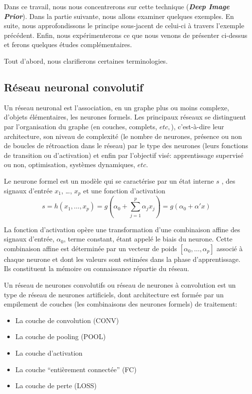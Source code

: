 \documentclass[
  11pt,
  dvipsnames]{article}
\providecommand{\tightlist}{%
  \setlength{\itemsep}{0pt}\setlength{\parskip}{0pt}}
\begin{document}
Dans ce travail, nous nous concentrerons sur cette technique (\textbf{\emph{Deep Image Prior}}). Dans la partie suivante, nous allons examiner quelques exemples. En suite, nous approfondissons le principe sous-jacent de celui-ci à travers l'exemple précédent. Enfin, nous expérimenterons ce que nous venons de présenter ci-dessus et ferons quelques études complémentaires.

Tout d'abord, nous clarifierons certaines terminologies.

\hypertarget{ruxe9seau-neuronal-convolutif}{%
\subsection{Réseau neuronal convolutif}\label{ruxe9seau-neuronal-convolutif}}

Un réseau neuronal est l'association, en un graphe plus ou moins complexe, d'objets élémentaires, les neurones formels. Les principaux réseaux se distinguent par l'organisation du graphe (en couches, complets, \(etc,\)), c'est-à-dire leur architecture, son niveau de complexité (le nombre de neurones, présence ou non de boucles de rétroaction dans le réseau) par le type des neurones (leurs fonctions de transition ou d'activation) et enfin par l'objectif visé: apprentissage supervisé ou non, optimisation, systèmes dynamiques, \(etc.\)

Le neurone formel est un modèle qui se caractérise par
un état interne \(s\) , des signaux d'entrée \(x_{1}\), \dots, \(x_{p}\) et une fonction d'activation
\[ s=h(x_{1},\dots,x_{p})=g(\alpha_{0} + \sum_{j=1}^{p} \alpha_{j}x_{j}) = g(\alpha_{0} + \alpha' x)\]

La fonction d'activation opère une transformation d'une combinaison affine
des signaux d'entrée, \(\alpha_{0}\), terme constant, étant appelé le biais du neurone.
Cette combinaison affine est déterminée par un vecteur de poids
\([\alpha_{0},\dots,\alpha_{p}]\) associé à chaque neurone et dont les valeurs sont estimées dans la phase d'apprentissage. Ils constituent la mémoire ou connaissance répartie du réseau.

Un réseau de neurones convolutifs ou réseau de neurones à convolution
est un type de réseau de neurones artificiels, dont architecture est formée par
un empilement de couches (les combinaisons des neurones formels) de traitement:

\begin{itemize}
\tightlist
\item
  La couche de convolution (CONV)
\item
  La couche de pooling (POOL)
\item
  La couche d'activation
\item
  La couche ``entièrement connectée'' (FC)
\item
  La couche de perte (LOSS)
\end{itemize}
\end{document}
